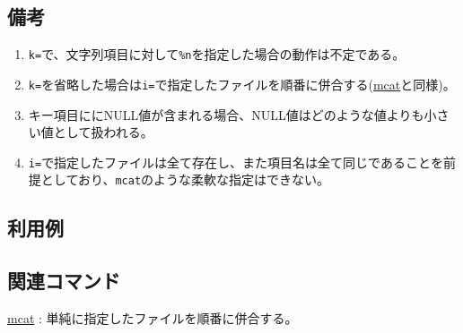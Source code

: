 \subsection*{備考}
\begin{enumerate}
\item \verb|k=|で、文字列項目に対して\verb|%n|を指定した場合の動作は不定である。
\item \verb|k=|を省略した場合は\verb|i=|で指定したファイルを順番に併合する(\hyperref[sect:mcat]{mcat}と同様)。
\item キー項目ににNULL値が含まれる場合、NULL値はどのような値よりも小さい値として扱われる。
\item \verb|i=|で指定したファイルは全て存在し、また項目名は全て同じであることを前提としており、\verb|mcat|のような柔軟な指定はできない。
\end{enumerate}

\subsection*{利用例}

\subsection*{関連コマンド}
\hyperref[sect:mcat]{mcat} : 単純に指定したファイルを順番に併合する。

%

